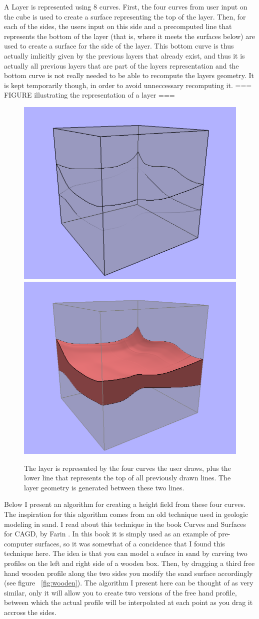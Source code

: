 \documentclass[a4paper,12pt]{article}
\begin{document}
A Layer is represented using 8 curves. First, the four curves from user input on the cube is used to create a surface representing the top of the layer. Then, for each of the sides, the users input on this side and a precomputed line that represents the bottom of the layer (that is, where it meets the surfaces below) are used to create a surface for the side of the layer. This bottom curve is thus actually imlicitly given by the previous layers that already exist, and thus it is actually all previous layers that are part of the layers representation and the bottom curve is not really needed to be able to recompute the layers geometry. It is kept temporarily though, in order to avoid unneccessary recomputing it. === FIGURE illustrating the representation of a layer ===

\begin{figure}
\includegraphics[width=.5\linewidth]{thesis/layerRepresentation1.png}
\includegraphics[width=.5\linewidth]{thesis/layerRepresentation2.png}
 \caption{The layer is represented by the four curves the user draws, plus the lower line that represents the top of all previously drawn lines. The layer geometry is generated between these two lines.}
 \label{fig:layerRep}
\end{figure}


Below I present an algorithm for creating a height field from these four curves. The inspiration for this algorithm comes from an old technique used in geologic modeling in sand. I read about this technique in the book Curves and Surfaces for CAGD, by Farin \cite{farin2001curves}. In this book it is simply used as an example of pre-computer surfaces, so it was somewhat of a concidence that I found this technique here. The idea is that you can model a suface in sand by carving two profiles on the left and right side of a wooden box. Then, by dragging a third free hand wooden profile along the two sides you modify the sand surface accordingly (see figure ~\ref{fig:wooden}). The algorithm I present here can be thought of as very similar, only it will allow you to create two versions of the free hand profile, between which the actual profile will be interpolated at each point as you drag it accross the sides.
\end{document}

